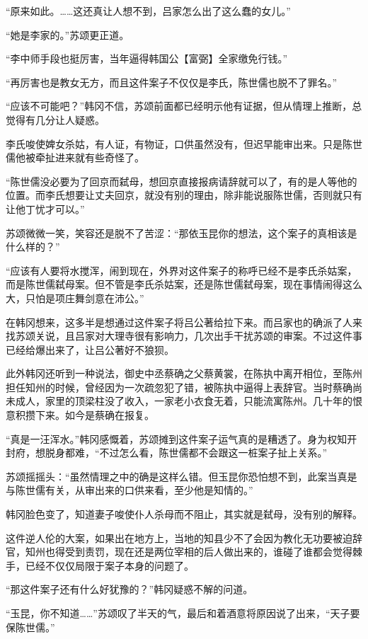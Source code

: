 “原来如此。……这还真让人想不到，吕家怎么出了这么蠢的女儿。”

“她是李家的。”苏颂更正道。

“李中师手段也挺厉害，当年逼得韩国公【富弼】全家缴免行钱。”

“再厉害也是教女无方，而且这件案子不仅仅是李氏，陈世儒也脱不了罪名。”

“应该不可能吧？”韩冈不信，苏颂前面都已经明示他有证据，但从情理上推断，总觉得有几分让人疑惑。

李氏唆使婢女杀姑，有人证，有物证，口供虽然没有，但迟早能审出来。只是陈世儒他被牵扯进来就有些奇怪了。

“陈世儒没必要为了回京而弑母，想回京直接报病请辞就可以了，有的是人等他的位置。而李氏想要让丈夫回京，就没有别的理由，除非能说服陈世儒，否则就只有让他丁忧才可以。”

苏颂微微一笑，笑容还是脱不了苦涩：“那依玉昆你的想法，这个案子的真相该是什么样的？”

“应该有人要将水搅浑，闹到现在，外界对这件案子的称呼已经不是李氏杀姑案，而是陈世儒弑母案。但不管是李氏杀姑案，还是陈世儒弑母案，现在事情闹得这么大，只怕是项庄舞剑意在沛公。”

在韩冈想来，这多半是想通过这件案子将吕公著给拉下来。而吕家也的确派了人来找苏颂关说，且吕家对大理寺很有影响力，几次出手干扰苏颂的审案。不过这件事已经给爆出来了，让吕公著好不狼狈。

此外韩冈还听到一种说法，御史中丞蔡确之父蔡黄裳，在陈执中离开相位，至陈州担任知州的时候，曾经因为一次疏忽犯了错，被陈执中逼得上表辞官。当时蔡确尚未成人，家里的顶梁柱没了收入，一家老小衣食无着，只能流寓陈州。几十年的恨意积攒下来。如今是蔡确在报复。

“真是一汪浑水。”韩冈感慨着，苏颂摊到这件案子运气真的是糟透了。身为权知开封府，想脱身都难，“不过怎么看，陈世儒都不会跟这一桩案子扯上关系。”

苏颂摇摇头：“虽然情理之中的确是这样么错。但玉昆你恐怕想不到，此案当真是与陈世儒有关，从审出来的口供来看，至少他是知情的。”

韩冈脸色变了，知道妻子唆使仆人杀母而不阻止，其实就是弑母，没有别的解释。

这件逆人伦的大案，如果出在地方上，当地的知县少不了会因为教化无功要被迫辞官，知州也得受到责罚，现在还是两位宰相的后人做出来的，谁碰了谁都会觉得棘手，已经不仅仅局限于案子本身的问题了。

“那这件案子还有什么好犹豫的？”韩冈疑惑不解的问道。

“玉昆，你不知道……”苏颂叹了半天的气，最后和着酒意将原因说了出来，“天子要保陈世儒。”

